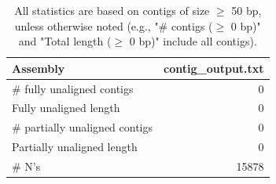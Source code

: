 \documentclass[12pt,a4paper]{article}
\begin{document}
\begin{table}[ht]
\begin{center}
\caption{All statistics are based on contigs of size $\geq$ 50 bp, unless otherwise noted (e.g., "\# contigs ($\geq$ 0 bp)" and "Total length ($\geq$ 0 bp)" include all contigs).}
\begin{tabular}{|l*{1}{|r}|}
\hline
Assembly & contig\_output.txt \\ \hline
\# fully unaligned contigs & 0 \\ \hline
Fully unaligned length & 0 \\ \hline
\# partially unaligned contigs & 0 \\ \hline
Partially unaligned length & 0 \\ \hline
\# N's & 15878 \\ \hline
\end{tabular}
\end{center}
\end{table}
\end{document}
